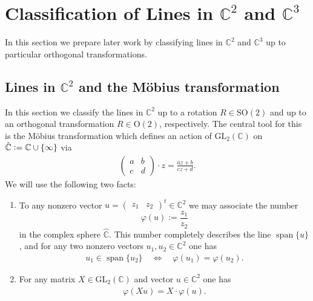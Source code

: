 \documentclass{amsart}
\newcommand{\C}{\mathbb{C}}
\DeclareMathOperator{\spann}{span}
\begin{document}
\section{Classification of Lines in \texorpdfstring{$\C^2$}{C2} and \texorpdfstring{$\C^3$}{C3}}
\label{sec::classification_of_lines}

In this section we prepare later work  by classifying lines in $\C^2$ and $\C^3$ up to particular orthogonal transformations. 

\subsection{Lines in \texorpdfstring{$\C^2$}{C2} and the M\"obius transformation}
\label{lin::subsec:lines_in_C2}

In this section we classify the lines in $\C^2$ up to a rotation $R \in \mathrm{SO}(2)$ and up to an orthogonal transformation $R \in \mathrm{O}(2)$, respectively.
The central tool for this is the Möbius transformation which defines an action of $\mathrm{GL}_2(\C)$ on $\hat{\C} \vcentcolon = \C \cup \{\infty\}$ via 
\begin{align*}
    \begin{pmatrix}
        a & b \\
        c & d
    \end{pmatrix}
    \cdot z = \frac{az+b}{cz+d}. 
\end{align*}
We will use the following two facts:
\begin{enumerate}
    \item To any nonzero vector $u = \begin{pmatrix}
        z_1 & z_2
    \end{pmatrix}^t \in \C^2$ we may associate the number 
    $$
    \varphi(u) := \frac{z_1}{z_2}
    $$
    in the complex sphere $\hat{\C}$. This number completely describes the line $\spann \{u\}$, and for any  two nonzero vectors $u_1, u_2 \in \C^2$ one has 
    \begin{align*}
        u_1 \in \spann\{u_2\} 
        \quad \Leftrightarrow \quad
        \varphi(u_1) = \varphi(u_2).
    \end{align*}
    \item For any matrix $X \in \mathrm{GL}_2(\C)$ and vector $u \in \C^2$ one has
    \begin{align*}
        \varphi(X u) = X \cdot \varphi(u).
    \end{align*}
\end{enumerate}
\end{document}
